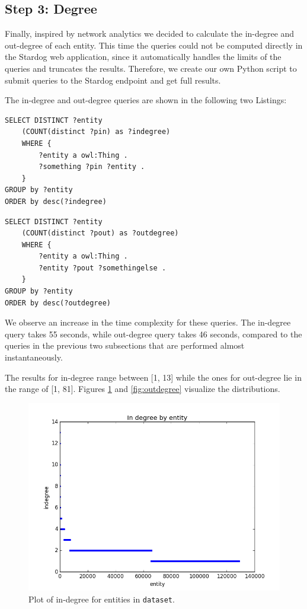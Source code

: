\documentclass[runningheads,a4paper]{../../StyleFiles/llncs}
\begin{document}
\subsection{Step 3: Degree}
Finally, inspired by network analytics we decided to calculate the in-degree and out-degree of each entity. This time the queries could not be computed directly in the Stardog web application, since it automatically handles the limits of the queries and truncates the results. Therefore, we create our own Python script to submit queries to the Stardog endpoint and get full results. 

The in-degree and out-degree queries are shown in the following two Listings:

\begin{lstlisting}[captionpos=b, caption=SPARQL query for calculating in degree of entities, label=lst:sparql, basicstyle=\ttfamily\small,frame=bt]
SELECT DISTINCT ?entity
	(COUNT(distinct ?pin) as ?indegree)
	WHERE { 
		?entity a owl:Thing .
		?something ?pin ?entity .
	}
GROUP by ?entity
ORDER by desc(?indegree)
\end{lstlisting}

\begin{lstlisting}[captionpos=b, caption=SPARQL query for calculating out degree of entities, label=lst:sparql, basicstyle=\ttfamily\small,frame=bt]
SELECT DISTINCT ?entity
	(COUNT(distinct ?pout) as ?outdegree)
	WHERE { 
		?entity a owl:Thing .
		?entity ?pout ?somethingelse .
	}
GROUP by ?entity
ORDER by desc(?outdegree)
\end{lstlisting}

We observe an increase in the time complexity for these queries. The in-degree query takes 55 seconds, while out-degree query takes 46 seconds, compared to the queries in the previous two subsections that are performed almost instantaneously. 

The results for in-degree range between [1, 13] while the ones for out-degree lie in the range of [1, 81]. Figures \ref{fig:indegree} and \ref{fig:outdegree} visualize the distributions.

\begin{figure}[h]
	\centering
	\includegraphics[width=.7\textwidth]{img/dataset_indegree.png}
	\caption{Plot of in-degree for entities in \texttt{dataset}.}
	\label{fig:indegree}
\end{figure}
\end{document}
